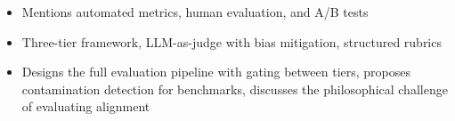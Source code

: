 \begin{interviewq}
\goodgreat
\begin{itemize}
    \item {} Mentions automated metrics, human evaluation, and A/B tests
    \item {} Three-tier framework, LLM-as-judge with bias mitigation, structured rubrics
    \item {} Designs the full evaluation pipeline with gating between tiers, proposes contamination detection for benchmarks, discusses the philosophical challenge of evaluating alignment
\end{itemize}

\end{interviewq}

